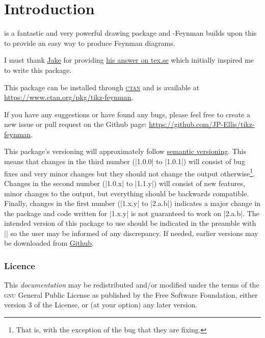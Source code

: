 \documentclass[a4paper,final]{ltxdoc}
\providecommand{\tikzfeynmanname}{\tikzname-Feynman}
\begin{document}
\section{Introduction}
\label{sec:introduction}

\href{https://www.ctan.org/pkg/pgf}{\tikzname} is a fantastic and very powerful
drawing package and \tikzfeynmanname{} builds upon this to provide an easy way
to produce Feynman diagrams.

I must thank \href{http://tex.stackexchange.com/users/2552}{Jake} for providing
\href{http://tex.stackexchange.com/a/87395/26980}{his answer on tex.se} which
initially inspired me to write this package.

This package can be installed through
\href{https://www.ctan.org/pkg/tikz-feynman}{\textsc{ctan}} and is available at
\url{https://www.ctan.org/pkg/tikz-feynman}.

If you have any suggestions or have found any bugs, please feel free to create a
new issue or pull request on the Github page:
\url{https://github.com/JP-Ellis/tikz-feynman}.

This package's versioning will approximately follow
\href{http://semverg.org}{semantic versioning}.  This means that changes in the
third number (|1.0.0| to |1.0.1|) will consist of bug fixes and very minor
changes but they should not change the output otherwise\footnote{That is, with
  the exception of the bug that they are fixing.}.  Changes in the second number
(|1.0.x| to |1.1.y|) will consist of new features, minor changes to the output,
but everything should be backwards compatible.  Finally, changes in the first
number (|1.x.y| to |2.a.b|) indicates a major change in the package and code
written for |1.x.y| is not guaranteed to work on |2.a.b|.  The intended version
of this package to use should be indicated in the preamble with
|| so the user may be informed of any discrepancy.
If needed, earlier versions may be downloaded from
\href{http://github.com/JP-Ellis/tikz-feynman/releases}{Github}.

\subsubsection{Licence}
\label{subsubsec:licence}

This \emph{documentation} may be redistributed and/or modified under the terms
of the \textsc{gnu} General Public License as published by the Free Software
Foundation, either version 3 of the License, or (at your option) any later
version.
\end{document}
